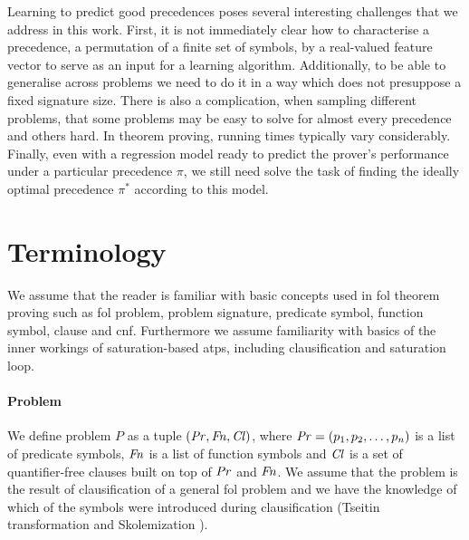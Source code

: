Learning to predict good precedences poses several interesting challenges that we address in this work.
First, it is not immediately clear how to characterise a precedence, a permutation of a finite set of symbols,
by a real-valued feature vector to serve as an input for a learning algorithm. 
Additionally, to be able to generalise across problems
we need to do it in a way which does not presuppose a fixed signature size. 
There is also a complication, when sampling different problems,
that some problems may be easy to solve for almost every precedence and others hard.
In theorem proving, running times typically vary considerably.
Finally, even with a regression model ready to predict the prover's performance 
under a particular precedence $\pi$, we still need solve the task of finding 
the ideally optimal precedence $\pi^*$ according to this model.







\newpage

\section{Terminology}

We assume that the reader is familiar with basic concepts used in \gls{fol} theorem proving
such as \gls{fol} problem, problem signature, predicate symbol, function symbol, clause and \gls{cnf}.
Furthermore we assume familiarity with basics of the inner workings of saturation-based \glspl{atp},
including clausification and saturation loop.


\paragraph{Problem}
We define problem \(P\) as a tuple \((\operatorname{\mathit{Pr}}, \operatorname{\mathit{Fn}}, \operatorname{\mathit{Cl}})\),
where \(\operatorname{\mathit{Pr}} = (p_1, p_2, \ldots, p_n)\) is a list of predicate symbols,
\(\operatorname{\mathit{Fn}}\) is a list of function symbols
and \(\operatorname{\mathit{Cl}}\) is a set of quantifier-free clauses built on top of \(\operatorname{\mathit{Pr}}\) and \(\operatorname{\mathit{Fn}}\).
We assume that the problem is the result of clausification of a general \gls{fol} problem
and we have the knowledge of which of the symbols were introduced during clausification
(Tseitin transformation \cite{?} and Skolemization \cite{?}).

